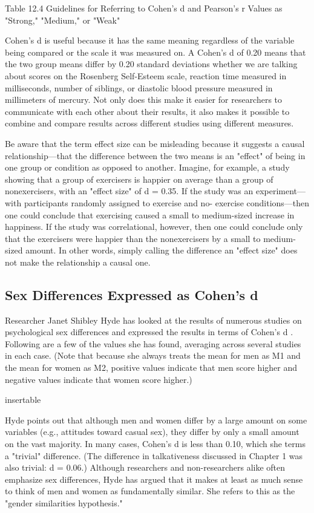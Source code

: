 Table 12.4 Guidelines for Referring to Cohen's d and Pearson's r Values as "Strong," "Medium," or "Weak"

Cohen's d is useful because it has the same meaning regardless of the variable being compared or the scale it was measured on. A Cohen's d of 0.20 means that the two group means differ by 0.20 standard deviations whether we are talking about scores on the Rosenberg Self-Esteem scale, reaction time measured in milliseconds, number of siblings, or diastolic blood pressure measured in millimeters of mercury. Not only does this make it easier for researchers to communicate with each other about their results, it also makes it possible to combine and compare results across different studies using different measures.


Be aware that the term effect size can be misleading because it suggests a causal relationship---that the difference between the two means is an "effect" of being in one group or condition as opposed to another. Imagine, for example, a study showing that a group of exercisers is happier on average than a group of nonexercisers, with an "effect size" of d = 0.35. If the study was an experiment---with participants randomly assigned to exercise and no- exercise conditions---then one could conclude that exercising caused a small to medium-sized increase in happiness. If the study was correlational, however, then one could conclude only that the exercisers were happier than the nonexercisers by a small to medium-sized amount. In other words, simply calling the difference an "effect size" does not make the relationship a causal one.


\subsection{Sex Differences Expressed as Cohen's d}

Researcher Janet Shibley Hyde has looked at the results of numerous studies on psychological sex differences and expressed the results in terms of Cohen's d \citep{hyde_new_2007}. Following are a few of the values she has found, averaging across several studies in each case. (Note that because she always treats the mean for men as M1 and the mean for women as M2, positive values indicate that men score higher and negative values indicate that women score higher.)

insertable

Hyde points out that although men and women differ by a large amount on some variables (e.g., attitudes toward casual sex), they differ by only a small amount on the vast majority. In many cases, Cohen's d is less
than 0.10, which she terms a "trivial" difference. (The difference in talkativeness discussed in Chapter 1 was also trivial: d = 0.06.) Although researchers and non-researchers alike often emphasize sex differences, Hyde has argued that it makes at least as much sense to think of men and women as fundamentally similar. She refers to this as the "gender similarities hypothesis."

